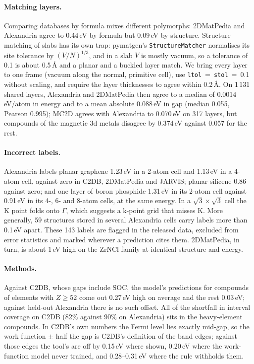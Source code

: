\documentclass[11pt]{article}
\begin{document}
\paragraph{Matching layers.} Comparing databases by formula mixes different
polymorphs: 2DMatPedia and Alexandria agree to 0.44\,eV by formula but 0.09\,eV by
structure. Structure matching of slabs has its own trap: pymatgen's
\texttt{StructureMatcher} normalises its site tolerance by $(V/N)^{1/3}$, and in a slab
$V$ is mostly vacuum, so a tolerance of 0.1 is about 0.5\,\AA{} and a planar and a
buckled layer match. We bring every layer to one frame (vacuum along the normal,
primitive cell), use \texttt{ltol}~=~\texttt{stol}~=~0.1 without scaling, and require
the layer thicknesses to agree within 0.2\,\AA. On 1\,131 shared layers, Alexandria and
2DMatPedia then agree to a median of 0.0014\,eV/atom in energy and to a mean absolute
0.088\,eV in gap (median 0.055, Pearson 0.995); MC2D agrees with Alexandria to 0.070\,eV on 317 layers, but compounds
of the magnetic 3d metals disagree by 0.374\,eV against 0.057 for the rest.

\paragraph{Incorrect labels.} Alexandria labels planar graphene 1.23\,eV in a 2-atom
cell and 1.13\,eV in a 4-atom cell, against zero in C2DB, 2DMatPedia and JARVIS; planar
silicene 0.86 against zero; and one layer of boron phosphide 1.31\,eV in its 2-atom
cell against 0.91\,eV in its 4-, 6- and 8-atom cells, at the same energy. In a
$\sqrt3\times\sqrt3$ cell the K point folds onto $\Gamma$, which suggests a k-point grid
that misses K. More generally, 59 structures stored in several Alexandria cells carry
labels more than 0.1\,eV apart. These 143 labels are flagged in the released data,
excluded from error statistics and marked wherever a prediction cites them.
2DMatPedia, in turn, is about 1\,eV high on the ZrNCl family at identical structure and
energy.

\paragraph{Methods.} Against C2DB, whose gaps include SOC, the model's predictions for
compounds of elements with $Z\ge52$ come out 0.27\,eV high on average and the rest
0.03\,eV; against held-out Alexandria there is no such offset. All of the shortfall in
interval coverage on C2DB (82\% against 90\% on Alexandria) sits in the heavy-element
compounds. In C2DB's own numbers the Fermi level lies exactly mid-gap, so the work
function $\pm$ half the gap is C2DB's definition of the band edges; against those edges
the tool's are off by 0.15\,eV where shown, 0.20\,eV where the work-function model never
trained, and 0.28--0.31\,eV where the rule withholds them.
\end{document}
